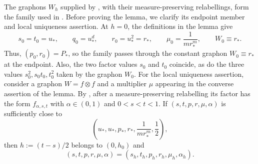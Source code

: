 The graphons $W_h$ supplied by ,
with their measure-preserving relabellings, form the family used in
.  Before proving the lemma, we clarify its
endpoint member and local uniqueness assertion.
At $h=0$, the definitions in the lemma give
\[
  s_0=t_0=u_*,
  \qquad
  q_0=u_*^d,
  \qquad
  r_0=u_*^2=r_*,
  \qquad
  \mu_0=\frac1{m r_*^m},
  \qquad
  W_0\equiv r_*.
\]
Thus, $(p_0,r_0)=P_*$, so the family passes through the constant graphon
$W_0\equiv r_*$ at the endpoint.  Also, the two factor values $s_0$ and
$t_0$ coincide, as do the three values $s_0^2,s_0t_0,t_0^2$ taken by the
graphon $W_0$.
For the local uniqueness assertion, consider a graphon $W=f\otimes f$ and a
multiplier $\mu$ appearing in the converse assertion of the lemma.  By
, after a measure-preserving relabelling its
factor has the form $f_{\alpha,s,t}$ with
$\alpha\in(0,1)$ and $0<s<t<1$.  If
$(s,t,p,r,\mu,\alpha)$ is sufficiently close to
\[
  \left(u_*,u_*,p_*,r_*,\frac1{m r_*^m},\frac12\right),
\]
then $h:=(t-s)/2$ belongs to $(0,h_0)$ and
\[
  (s,t,p,r,\mu,\alpha)
  =(s_h,t_h,p_h,r_h,\mu_h,\alpha_h).
\]

